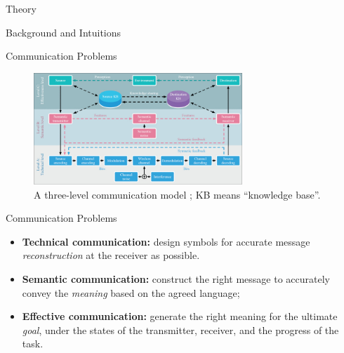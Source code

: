 \documentclass[presentation,mathserif,9pt]{beamer}
\begin{document}
\begin{section}{Theory}
\begin{subsection}{Background and Intuitions}
		\begin{frame}{Communication Problems}
			\begin{figure}
				\includegraphics[width=0.7\textwidth]{assets/three_level_communication_model.jpg}
				\caption{A three-level communication model \cite{Luo2022a}; KB means ``knowledge base''.}
			\end{figure}
			\vspace{-0.4cm}
			\begin{block}{Communication Problems}
				\begin{itemize}
					\item \textbf{Technical communication:} design symbols for accurate message \emph{reconstruction} at the receiver as possible.
					\item \textbf{\color{blue}Semantic communication:} construct the right message to accurately convey the \emph{meaning} based on the agreed language;
					\item \textbf{Effective communication:} generate the right meaning for the ultimate \emph{goal}, under the states of the transmitter, receiver, and the progress of the task.
				\end{itemize}
			\end{block}
		\end{frame}


\end{subsection}
\end{section}
\end{document}
